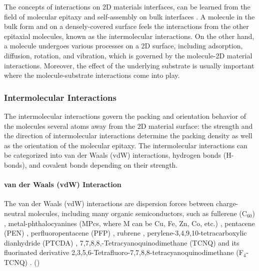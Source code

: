 The concepts of interactions on 2D materials interfaces, can be
learned from the field of molecular epitaxy and self-assembly on bulk
interfaces
\cite{Kowarik_2008_rev_MBE,Barth_2007,Whitesides_2002_assem_rev,Philips_2D_assem_book}.
% 
A molecule in the bulk
form and on a densely-covered surface feels the interactions from the
other epitaxial molecules, known as the intermolecular
interactions. On the other hand, a molecule undergoes various
processes on a 2D surface, including adsorption, diffusion, rotation,
and vibration, which is governed by the molecule-2D material
interactions. Moreover, the effect of the underlying substrate is
usually important where the molecule-substrate interactions come into
play. 

\subsubsection{Intermolecular Interactions}
\label{sec:orgf0959e1}

The intermolecular interactions govern the packing and orientation
behavior of the molecules several atoms away from the 2D material
surface: the strength and the direction of intermolecular interactions
determine the packing density as well as the orientation of the
molecular epitaxy. The intermolecular interactions can be categorized 
into van der Waals (vdW) interactions, hydrogen bonds (H-bonds), and
covalent bonds depending on their strength. 

\paragraph{van der Waals (vdW) Interaction}

The van der Waals (vdW) interactions are dispersion forces between
charge-neutral molecules, including many organic semiconductors, such
as fullerene (C\(_{\text{60}}\))
\cite{Corso_2004_C60_hBN,Kim_2015_c60_gr,Chen_2016_c60_mos2},
metal-phthalo\-cyanines (MPcs, where M can be Cu, Fe, Zn, Co, etc.)
\cite{Xiao_2013_jacs_CuPc_gr,Wang_2010_selec_F16_gr,Zhang_2011_FePc_gr,Hamalainen_2012_CoPc_gr_Ir,Ying_Mao_2011_ge_clAlPc,Ogawa_2013_AlCiPc_gr,Pak_2015_CuPc_MoS2,Avvisati_2017_FePc_intercal,Iannuzzi_2014_MPc_hBN_Rh},
pentacene (PEN)
\cite{Lee_2011_pentacene,Jariwala_2016_Mos2_pentacene,Shen_2017_DFT_mos2_pent,Kim_2016_trap_Mos2_pent,Nguyen_2015_pent_gr_wett,Betti_2007_orien_pentacene},
perfluoropentacene (PFP)
\cite{Salzmann_2012_fpen_gr,Breuer_2016_acnene_mos2}, rubrene
\cite{Lee_2014_rubene_hBN}, perylene-3,4,9,10-tetra\-carboxylic
dianhydride (PTCDA)
\cite{Wang_2009_STM_PTCDA_Gr,Tian_2010_PTCDA_gr,Huang_2009_PTCDA_gr,Meissner_2012_PTCDA_BLG},
7,7,8,8,-Tetra\-cyanoquino\-dimethane (TCNQ) and its fluorinated
derivative 2,3,5,6-Tetra\-fluoro-7,7,8,8-tetra\-cyanoquino\-dimethane
(F\(_{\text{4}}\)-TCNQ)
\cite{Chen_2007_TCNQ_gr,Hong_2013_ftcnq_gr,Stradi_2014_TCNQ_gr_Ru,Tsai_2015_TCNQ_gr_hbn}.
()

